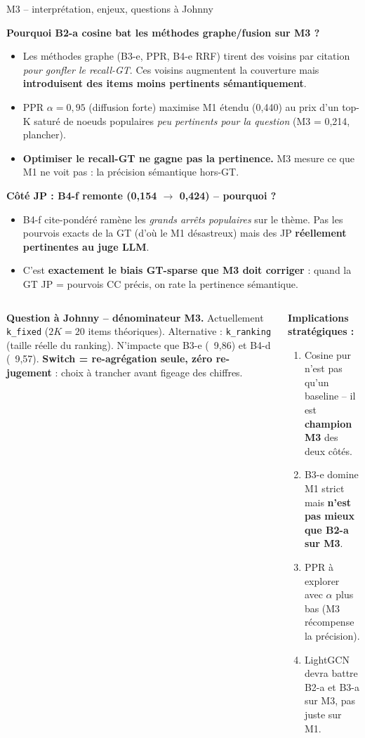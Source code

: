 \documentclass[aspectratio=169,10pt]{beamer}
\newcommand{\keybox}[1]{%
  \begin{center}
  \colorbox{accentsoft}{\parbox{0.92\linewidth}{\centering #1}}
  \end{center}}
\newcommand{\warnbox}[1]{%
  \begin{center}
  \colorbox{red!10}{\parbox{0.92\linewidth}{\centering #1}}
  \end{center}}
\begin{document}
\begin{frame}{M3 -- interprétation, enjeux, questions à Johnny}
  \footnotesize

  \textbf{Pourquoi B2-a cosine bat les méthodes graphe/fusion sur M3 ?}
  \begin{itemize}\setlength{\itemsep}{0.05em}
    \item Les méthodes graphe (B3-e, PPR, B4-e RRF) tirent des voisins par citation
    \emph{pour gonfler le recall-GT}. Ces voisins augmentent la couverture mais
    \textbf{introduisent des items moins pertinents sémantiquement}.
    \item PPR $\alpha=0{,}95$ (diffusion forte) maximise M1 étendu (0,440) au prix
    d'un top-K saturé de noeuds populaires \emph{peu pertinents pour la question}
    (M3 = 0,214, plancher).
    \item \textbf{Optimiser le recall-GT ne gagne pas la pertinence.} M3 mesure ce
    que M1 ne voit pas : la précision sémantique hors-GT.
  \end{itemize}

  \vspace{0.4em}
  \textbf{Côté JP : B4-f remonte (0,154 $\to$ 0,424) -- pourquoi ?}
  \begin{itemize}\setlength{\itemsep}{0.05em}
    \item B4-f cite-pondéré ramène les \emph{grands arrêts populaires} sur le thème.
    Pas les pourvois exacts de la GT (d'où le M1 désastreux) mais des JP
    \textbf{réellement pertinentes au juge LLM}.
    \item C'est \textbf{exactement le biais GT-sparse que M3 doit corriger} :
    quand la GT JP = pourvois CC précis, on rate la pertinence sémantique.
  \end{itemize}

  \vspace{0.4em}
  \begin{columns}[T]
    \warnbox{\scriptsize \textbf{Question à Johnny -- dénominateur M3.}
    Actuellement \texttt{k\_fixed} ($2K{=}20$ items théoriques). Alternative :
    \texttt{k\_ranking} (taille réelle du ranking). N'impacte que B3-e (~9,86) et
    B4-d (~9,57). \textbf{Switch = re-agrégation seule, zéro re-jugement} : choix
    à trancher avant figeage des chiffres.}

    \keybox{\scriptsize \textbf{Implications stratégiques :}
    \begin{enumerate}\setlength{\itemsep}{0.05em}
      \item Cosine pur n'est pas qu'un baseline -- il est \textbf{champion M3}
      des deux côtés.
      \item B3-e domine M1 strict mais \textbf{n'est pas mieux que B2-a sur M3}.
      \item PPR à explorer avec $\alpha$ plus bas (M3 récompense la précision).
      \item LightGCN devra battre B2-a et B3-a sur M3, pas juste sur M1.
    \end{enumerate}}
  \end{columns}
\end{frame}
\end{document}
